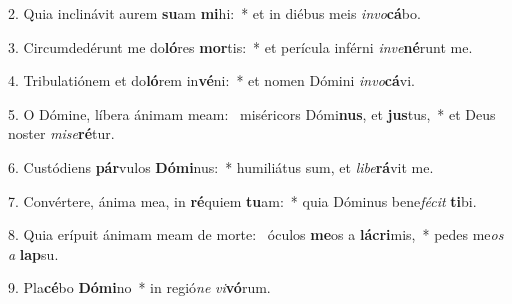 2. Quia inclinávit aurem \textbf{su}am \textbf{mi}hi:~*  et in diébus meis \textit{in}\textit{vo}\textbf{cá}bo.\

3. Circumdedérunt me do\textbf{ló}res \textbf{mor}tis:~*  et perícula inférni \textit{in}\textit{ve}\textbf{né}runt me.\

4. Tribulatiónem et do\textbf{ló}rem in\textbf{vé}ni:~*  et nomen Dómini \textit{in}\textit{vo}\textbf{cá}vi.\

5. O Dómine, líbera ánimam meam: \dag\  miséricors Dómi\textbf{nus}, et \textbf{jus}tus,~*  et Deus noster \textit{mi}\textit{se}\textbf{ré}tur.\

6. Custódiens \textbf{pár}vulos \textbf{Dó}\textbf{mi}nus:~*  humiliátus sum, et \textit{li}\textit{be}\textbf{rá}vit me.\

7. Convértere, ánima mea, in \textbf{ré}quiem \textbf{tu}am:~*  quia Dóminus bene\textit{fé}\textit{cit} \textbf{ti}bi.\

8. Quia erípuit ánimam meam de morte: \dag\  óculos \textbf{me}os a \textbf{lá}\textbf{cri}mis,~*  pedes me\textit{os} \textit{a} \textbf{lap}su.\

9. Pla\textbf{cé}bo \textbf{Dó}\textbf{mi}no~*  in regió\textit{ne} \textit{vi}\textbf{vó}rum.\


